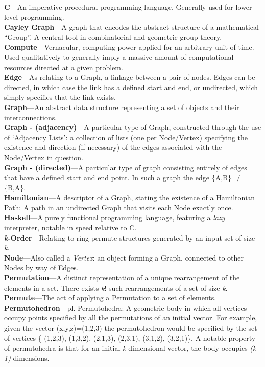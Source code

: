 \documentclass[12pt]{article}
\begin{document}
\textbf{C}---An imperative procedural programming language. Generally used for lower-level programming.\\
\textbf{Cayley Graph}---A graph that encodes the abstract structure of a mathematical ``Group''. A central tool in combinatorial and geometric group theory.\\
\textbf{Compute}---Vernacular, computing power applied for an arbitrary unit of time. Used qualitatively to generally imply a massive amount of computational resources directed at a given problem.\\
\textbf{Edge}---As relating to a Graph, a linkage between a pair of nodes. Edges can be directed, in which case the link has a defined start and end, or undirected, which simply specifies that the link exists.\\
\textbf{Graph}---An abstract data structure representing a set of objects and their interconnections.\\
\textbf{Graph - (adjacency)}---A particular type of Graph, constructed through the use of `Adjacency Lists': a collection of lists (one per Node/Vertex) specifying the existence and direction (if necessary) of the edges associated with the Node/Vertex in question.\\
\textbf{Graph - (directed)}---A particular type of graph consisting entirely of edges that have a defined start and end point. In such a graph the edge \{A,B\} $\neq$ \{B,A\}.\\
\textbf{Hamiltonian}---A descriptor of a Graph, stating the existence of a Hamiltonian Path: A path in an undirected Graph that visits each Node exactly once.\\
\textbf{Haskell}---A purely functional programming language, featuring a \emph{lazy} interpreter, notable in speed relative to C.\\
\textbf{\emph{k}-Order}---Relating to ring-permute structures generated by an input set of size \emph{k}.\\
\textbf{Node}---Also called a \emph{Vertex}: an object forming a Graph, connected to other Nodes by way of Edges.\\
\textbf{Permutation}---A distinct representation of a unique rearrangement of the elements in a set. There exists \emph{k}! such rearrangements of a set of size \emph{k}.\\
\textbf{Permute}---The act of applying a Permutation to a set of elements.\\
\textbf{Permutohedron}---pl. Permutohedra: A geometric body in which all vertices occupy points specified by all the permutations of an initial vector. For example, given the vector (x,y,z)=(1,2,3) the permutohedron would be specified by the set of vertices \{ (1,2,3), (1,3,2), (2,1,3), (2,3,1), (3,1,2), (3,2,1)\}. A notable property of permutohedra is that for an initial \emph{k}-dimensional vector, the body occupies \emph{(k-1)} dimensions.\\
\end{document}
